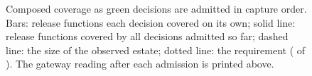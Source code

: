 \begin{figure}[pos=tbp]
\centering

\caption{Composed coverage as green decisions are admitted in capture order. Bars: release functions each decision covered on its own; solid line: release functions covered by all decisions admitted so far; dashed line: the size of the observed estate; dotted line: the requirement (\FixTauQ{} of \FixMq{}). The gateway reading after each admission is printed above. \CoverageSentence{}}
\label{fig:coverage}
\end{figure}
